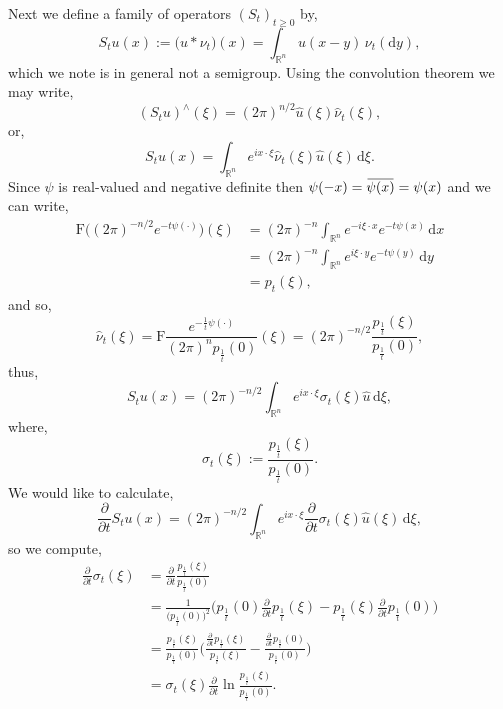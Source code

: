 \documentclass[a4paper, 12pt]{report}
\theoremstyle{cor}
\theoremstyle{remark}
\theoremstyle{definition}
\newcommand{\overbar}[1]{\mkern 1.5mu\overline{\mkern-1.5mu#1\mkern-1.5mu}\mkern 1.5mu}
\begin{document}
Next we define a family of operators $(S_t)_{t \ge 0}$ by,
\begin{equation}
S_tu(x) := \big(u \ast \nu_t\big)(x) = \int_{\mathbb{R}^n}u(x - y)\,\nu_t(\mathrm{d}y),
\end{equation}
which we note is in general not a semigroup.  Using the convolution theorem we may write,
$$
(S_tu)^\wedge(\xi) = (2\pi)^{n/2}\hat{u}(\xi)\hat{\nu}_t(\xi),
$$
or,
$$
S_tu(x) = \int_{\mathbb{R}^n}e^{ix\cdot\xi}\hat{\nu}_t(\xi)\hat{u}(\xi)\,\mathrm{d}\xi.
$$
Since $\psi$ is real-valued and negative definite then $\psi(-x) = \overbar{\psi(x)} = \psi(x)$ and we can write,
$$
\begin{aligned}
\mathrm{F}\big((2\pi)^{-n/2}e^{-t\psi(\cdot)}\big)(\xi) & = (2\pi)^{-n}\int_{\mathbb{R}^n}e^{-i\xi\cdot x}e^{-t\psi(x)}\,\mathrm{d}x\\
& = (2\pi)^{-n}\int_{\mathbb{R}^n}e^{i\xi\cdot y}e^{-t\psi(y)}\,\mathrm{d}y\\
& = p_t(\xi),
\end{aligned}
$$
and so,
$$
\hat{\nu}_t(\xi) = \mathrm{F}\frac{e^{-\frac{1}{t}\psi(\cdot)}}{(2\pi)^np_\frac{1}{t}(0)}(\xi) = (2\pi)^{-n/2}\frac{p_\frac{1}{t}(\xi)}{p_\frac{1}{t}(0)},
$$
thus,
\begin{equation}
S_tu(x) = (2\pi)^{-n/2}\int_{\mathbb{R}^n}e^{ix\cdot\xi}\sigma_t(\xi)\hat{u}\,\mathrm{d}\xi,
\end{equation}
where,
\begin{equation}
\sigma_t(\xi) := \frac{p_\frac{1}{t}(\xi)}{p_\frac{1}{t}(0)}.
\end{equation}
We would like to calculate,
$$
\frac{\partial}{\partial t}S_tu(x) = (2\pi)^{-n/2}\int_{\mathbb{R}^n}e^{ix\cdot\xi}\frac{\partial}{\partial t}\sigma_t(\xi)\hat{u}(\xi)\,\mathrm{d}\xi,
$$
so we compute,
$$
\begin{aligned}
\frac{\partial}{\partial t}\sigma_t(\xi) & = \frac{\partial}{\partial t}\frac{p_\frac{1}{t}(\xi)}{p_\frac{1}{t}(0)}\\
& = \frac{1}{\big(p_\frac{1}{t}(0)\big)^2}\bigg(p_\frac{1}{t}(0)\frac{\partial}{\partial t}p_\frac{1}{t}(\xi) - p_\frac{1}{t}(\xi)\frac{\partial}{\partial t}p_\frac{1}{t}(0)\bigg)\\
& = \frac{p_\frac{1}{t}(\xi)}{p_\frac{1}{t}(0)}\bigg(\frac{\frac{\partial}{\partial t}p_\frac{1}{t}(\xi)}{p_\frac{1}{t}(\xi)} - \frac{\frac{\partial}{\partial t}p_\frac{1}{t}(0)}{p_\frac{1}{t}(0)}\bigg)\\
& = \sigma_t(\xi)\frac{\partial}{\partial t}\ln\frac{p_\frac{1}{t}(\xi)}{p_\frac{1}{t}(0)}.
\end{aligned}
$$
\end{document}
